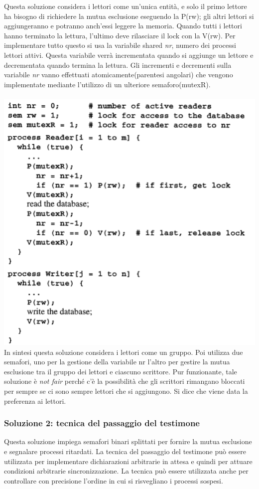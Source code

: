 \documentclass[10pt,a4paper]{article}
\begin{document}
Questa soluzione considera i lettori come un'unica entità, e solo il primo lettore ha bisogno di richiedere la mutua esclusione eseguendo la P(rw); gli altri lettori si aggiungeranno e potranno anch'essi leggere la memoria.
Quando tutti i lettori hanno terminato la lettura, l'ultimo deve rilasciare il lock con la V(rw).
Per implementare tutto questo si usa la variabile shared \textit{nr}, numero dei processi lettori attivi. Questa variabile verrà incrementata quando si aggiunge un lettore e decrementata quando termina la lettura.  Gli incrementi e decrementi sulla variabile \textit{nr} vanno effettuati atomicamente(parentesi angolari) che vengono implementate mediante l'utilizzo di un ulteriore semaforo(mutexR).\\ \\
\includegraphics[scale=0.41]{img/over3.png} \\
In sintesi questa soluzione considera i lettori come un gruppo. Poi utilizza due semafori, uno per la gestione della variabile nr l'altro per gestire la mutua esclusione tra il gruppo dei lettori e ciascuno scrittore.
Pur funzionante, tale soluzione è \textit{not fair} perché c'è la possibilità che gli scrittori rimangano bloccati per sempre se ci sono sempre lettori che si aggiungono. Si dice che viene data la preferenza ai lettori.

\subsubsection{Soluzione 2: tecnica del passaggio del testimone}
Questa soluzione impiega semafori binari splittati per fornire la mutua esclusione e segnalare processi ritardati.
La tecnica del passaggio del testimone può essere utilizzata per implementare dichiarazioni arbitrarie in attesa e quindi per attuare condizioni arbitrarie sincronizzazione. La tecnica può essere utilizzata anche per controllare con precisione l'ordine in cui si risvegliano i processi sospesi.
\end{document}
